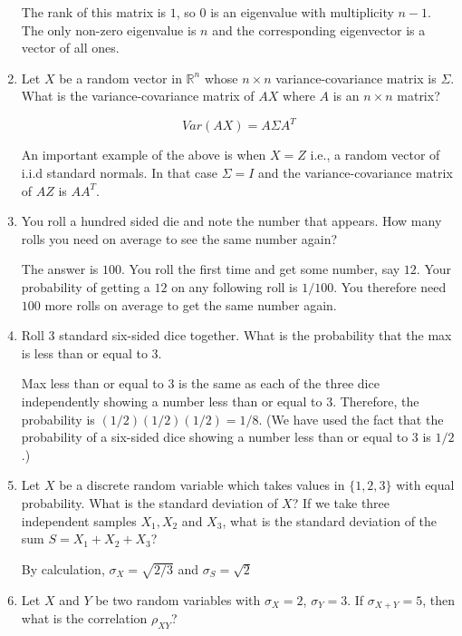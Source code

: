 \documentclass{amsart}
\theoremstyle{plain}
\numberwithin{equation}{section}
\begin{document}
\begin{enumerate}
The rank of this matrix is $1$, so $0$ is an eigenvalue
with multiplicity $n-1$. The only non-zero eigenvalue
is $n$ and the corresponding eigenvector is 
a vector of all ones. 

\item Let $X$ be a random vector in $\mathbb{R}^n$ whose
$n \times n$ variance-covariance 
matrix is $\Sigma$. What is the variance-covariance matrix of 
$AX$ where $A$ is an $n \times n$ matrix?

\begin{equation*}
Var(AX) = A \Sigma A^{T}
\end{equation*}

An important example of the above is when $X=Z$ i.e.,
a random vector of i.i.d standard normals. In that case
$\Sigma = I$ and the variance-covariance matrix 
of $AZ$ is $AA^T$.

\item You roll a hundred sided die and note the number 
that appears. How many rolls you need on average 
to see the same number again?

The answer is $100$. You roll the first time and get 
some number, say $12$. Your probability of getting a $12$
on any following roll is $1/100$. You therefore need
$100$ more rolls on average to get the same number again. 

\item Roll $3$ standard six-sided dice together. What is the 
probability that the max is less than or equal to $3$.

Max less than or equal to $3$ is the same as each of the 
three dice independently showing a number less than or equal to $3$. 
Therefore, the probability is $(1/2)(1/2)(1/2) = 1/8$. (We have used the fact
that the probability of a six-sided dice showing a 
number less than or equal to $3$ is $1/2$.)

\item Let $X$ be a discrete random variable which
takes values in $\lbrace 1, 2, 3 \rbrace$ with 
equal probability. What is the standard deviation of $X$?
If we take three independent samples $X_1, X_2$ and 
$X_3$, what is the standard deviation of the sum 
$S = X_1 + X_2 + X_3$?

By calculation, $\sigma_X = \sqrt{2/3}$ and 
$\sigma_S = \sqrt{2}$

\item Let $X$ and $Y$ be two random variables with
$\sigma_X=2$, $\sigma_Y=3$. If $\sigma_{X+Y} = 5$, 
then what is the correlation $\rho_{XY}$?


\end{enumerate}
\end{document}
